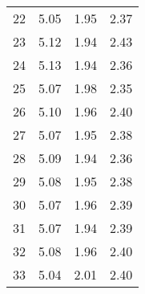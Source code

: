 \documentclass[a4paper]{article}
\begin{document}
\begin{minipage}{\textwidth}
\begin{tabular}{ c c c c }
                       22 &       5.05 &   1.95 &      2.37 \\
                       23 &       5.12 &   1.94 &      2.43 \\
                       24 &       5.13 &   1.94 &      2.36 \\
                       25 &       5.07 &   1.98 &      2.35 \\
                       26 &       5.10 &   1.96 &      2.40 \\
                       27 &       5.07 &   1.95 &      2.38 \\
                       28 &       5.09 &   1.94 &      2.36 \\
                       29 &       5.08 &   1.95 &      2.38 \\
                       30 &       5.07 &   1.96 &      2.39 \\
                       31 &       5.07 &   1.94 &      2.39 \\
                       32 &       5.08 &   1.96 &      2.40 \\
                       33 &       5.04 &   2.01 &      2.40 \\
            \end{tabular}
        \end{minipage}
        
\end{document}
